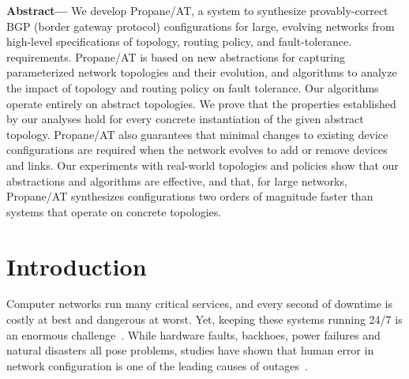 \documentclass[numbers, 10pt, preprint]{sigplanconf}
\newcommand{\sysname}{{\text{}\small \sf Propane/AT}\xspace}
\begin{document}
\textbf{Abstract---}
We develop \sysname, a system to synthesize provably-correct
BGP (border gateway protocol) configurations for large, evolving networks from high-level
specifications of topology, routing policy, and fault-tolerance.
requirements. \sysname is based on new abstractions for capturing
parameterized network topologies and their evolution, and algorithms
to analyze the impact of topology and routing policy on fault
tolerance. Our algorithms operate entirely on abstract topologies.  We
prove that the properties established by our analyses hold for every
concrete instantiation of the given abstract topology. \sysname
also guarantees that minimal changes to existing device configurations
are required when the network evolves to add or remove devices and
links. Our experiments with real-world topologies and policies show
that our abstractions and algorithms are effective, and that, for large
networks, \sysname synthesizes configurations two orders of magnitude
faster than systems that operate on concrete topologies.


%
%
%
%



%
%
%
%

\section{Introduction} \label{sec:introduction}




Computer networks run many critical services, and every second of downtime is
costly at best and dangerous at worst.  Yet, keeping these systems
running 24/7 is an enormous
challenge~\cite{mahajan+:bgp-misconfiguration,feamster+:rcc,batfish,dc-failure-study}.
%
While hardware faults, backhoes, power failures and natural disasters all pose
problems, studies have shown that human error in network
configuration is one of the leading causes of
outages~\cite{juniper-study,yankee-study}.
\end{document}
